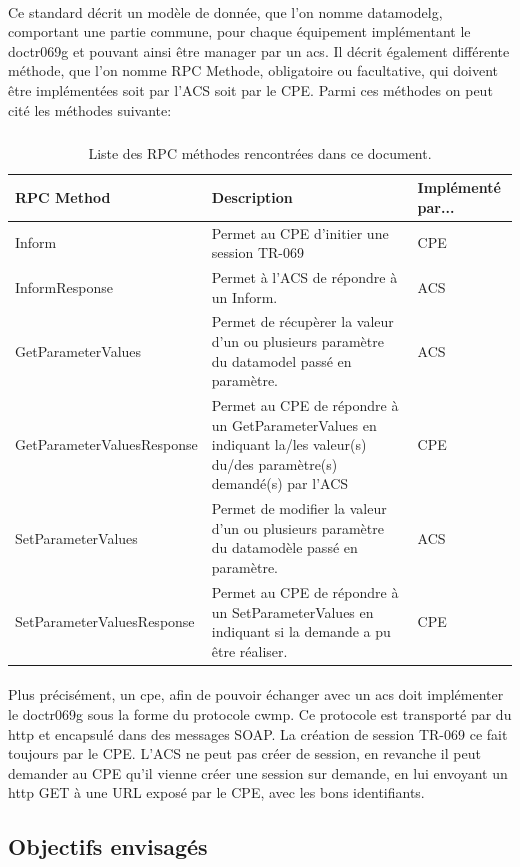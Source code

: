 \documentclass[12pt,a4paper]{report}
\begin{document}
\paragraph*{} Ce standard décrit un modèle de donnée, que l'on nomme \gls{datamodelg}, comportant une partie commune, pour chaque équipement implémentant le \gls{doctr069g} et pouvant ainsi être manager par un \gls{acs}. Il décrit également différente méthode, que l'on nomme RPC Methode, obligatoire ou facultative, qui doivent être implémentées soit par l'ACS soit par le CPE. Parmi ces méthodes on peut cité les méthodes suivante:
\subparagraph*{}

\begin{table}
	\begin{tabularx}{17cm}{|l|X|l|}
		\hline
		RPC Method & Description & Implémenté par...\tabularnewline
		\hline
		Inform & Permet au CPE d'initier une session TR-069 & CPE\tabularnewline
		\hline
		InformResponse & Permet à l'ACS de répondre à un Inform. & ACS\tabularnewline
		\hline
		GetParameterValues & Permet de récupèrer la valeur d'un ou plusieurs 				paramètre du datamodel passé en paramètre. & ACS\tabularnewline
		\hline
		GetParameterValuesResponse & Permet au CPE de répondre à un 						GetParameterValues en indiquant la/les valeur(s) du/des paramètre(s) 				demandé(s) par l'ACS & CPE\tabularnewline
		\hline
		SetParameterValues & Permet de modifier la valeur d'un ou plusieurs 				paramètre du datamodèle passé en paramètre. & ACS\tabularnewline
		\hline
		SetParameterValuesResponse & Permet au CPE de répondre à un 						SetParameterValues en indiquant si la demande a pu être réaliser. & CPE\tabularnewline
		\hline
	\end{tabularx}
	\centering
	\caption{Liste des RPC méthodes rencontrées dans ce document.}
\end{table}
\paragraph*{} Plus précisément, un \gls{cpe}, afin de pouvoir échanger avec un \gls{acs} doit implémenter le \gls{doctr069g} sous la forme du protocole \gls{cwmp}. Ce protocole est transporté par du \gls{http} et encapsulé dans des messages SOAP. La création de session TR-069 ce fait toujours par le CPE. L'ACS ne peut pas créer de session, en revanche il peut demander au CPE qu'il vienne créer une session sur demande, en lui envoyant un \gls{http} GET à une URL exposé par le CPE, avec les bons identifiants. 

\subsection{Objectifs envisagés}
\end{document}
